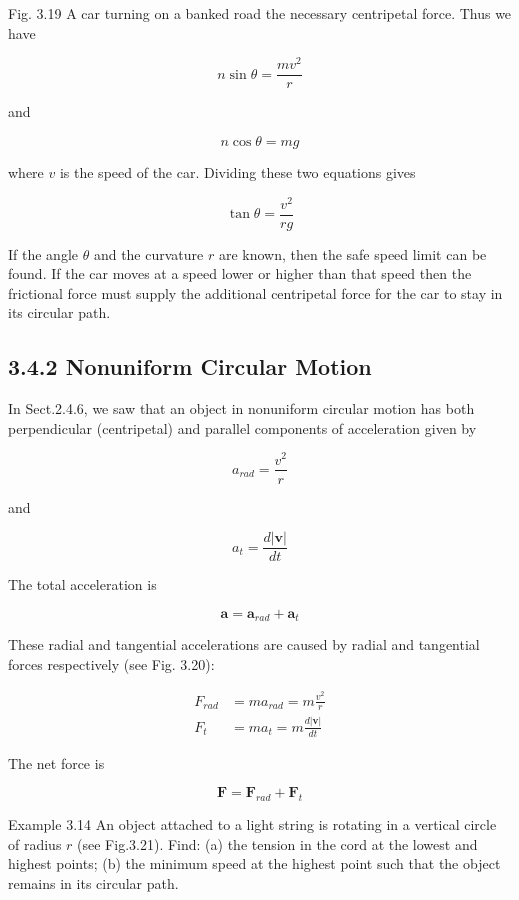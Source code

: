 \documentclass[10pt]{article}
\begin{document}
Fig. 3.19 A car turning on a banked road the necessary centripetal force. Thus we have

$$
n \sin \theta=\frac{m v^{2}}{r}
$$

and

$$
n \cos \theta=m g
$$

where $v$ is the speed of the car. Dividing these two equations gives

$$
\tan \theta=\frac{v^{2}}{r g}
$$

If the angle $\theta$ and the curvature $r$ are known, then the safe speed limit can be found. If the car moves at a speed lower or higher than that speed then the frictional force must supply the additional centripetal force for the car to stay in its circular path.

\subsection*{3.4.2 Nonuniform Circular Motion}
In Sect.2.4.6, we saw that an object in nonuniform circular motion has both perpendicular (centripetal) and parallel components of acceleration given by

$$
a_{r a d}=\frac{v^{2}}{r}
$$

and

$$
a_{t}=\frac{d|\mathbf{v}|}{d t}
$$

The total acceleration is

$$
\mathbf{a}=\mathbf{a}_{r a d}+\mathbf{a}_{t}
$$

These radial and tangential accelerations are caused by radial and tangential forces respectively (see Fig. 3.20):

$$
\begin{aligned}
F_{r a d} & =m a_{r a d}=m \frac{v^{2}}{r} \\
F_{t} & =m a_{t}=m \frac{d|\mathbf{v}|}{d t}
\end{aligned}
$$

The net force is

$$
\mathbf{F}=\mathbf{F}_{r a d}+\mathbf{F}_{t}
$$

Example 3.14 An object attached to a light string is rotating in a vertical circle of radius $r$ (see Fig.3.21). Find: (a) the tension in the cord at the lowest and highest points; (b) the minimum speed at the highest point such that the object remains in its circular path.
\end{document}
